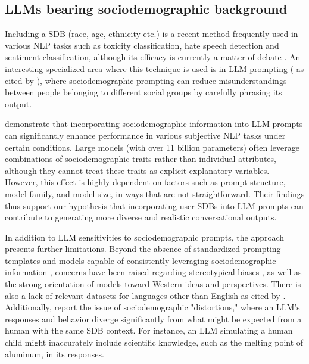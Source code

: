 \subsection{LLMs bearing sociodemographic background}
\label{sec:related:sociodemographic}

Including a \ac{SDB} (race, age, ethnicity etc.) is a recent method frequently used in various \ac{NLP} tasks such as toxicity classification, hate speech detection and sentiment classification, although its efficacy is currently a matter of debate \cite{beck-etal-2024-sensitivity}. An interesting specialized area where this technique is used is in LLM prompting (\cite{hwang-etal-2023-aligning, durmus2024measuringrepresentationsubjectiveglobal} as cited by \citet{beck-etal-2024-sensitivity}), where sociodemographic prompting can reduce misunderstandings between people belonging to different social groups by carefully phrasing its output. 

\citet{beck-etal-2024-sensitivity} demonstrate that incorporating sociodemographic information into LLM prompts can significantly enhance performance in various subjective \ac{NLP} tasks under certain conditions. Large models (with over 11 billion parameters) often leverage combinations of sociodemographic traits rather than individual attributes, although they cannot treat these traits as explicit explanatory variables. However, this effect is highly dependent on factors such as prompt structure, model family, and model size, in ways that are not straightforward. Their findings thus support our hypothesis that incorporating user \acp{SDB} into LLM prompts can contribute to generating more diverse and realistic conversational outputs.

In addition to LLM sensitivities to sociodemographic prompts, the approach presents further limitations. Beyond the absence of standardized prompting templates and models capable of consistently leveraging sociodemographic information \cite{beck-etal-2024-sensitivity}, concerns have been raised regarding stereotypical biases \cite{cheng-etal-2023-marked, deshpande-etal-2023-toxicity}, as well as the strong orientation of models toward Western ideas and perspectives. There is also a lack of relevant datasets for languages other than English \cite{pmlr-v202-santurkar23a, durmus2024measuringrepresentationsubjectiveglobal, santy-etal-2023-nlpositionality} as cited by \citet{beck-etal-2024-sensitivity}. Additionally, \citet{aher2023usinglargelanguagemodels} report the issue of sociodemographic "distortions," where an LLM’s responses and behavior diverge significantly from what might be expected from a human with the same \ac{SDB} context. For instance, an LLM simulating a human child might inaccurately include scientific knowledge, such as the melting point of aluminum, in its responses.


